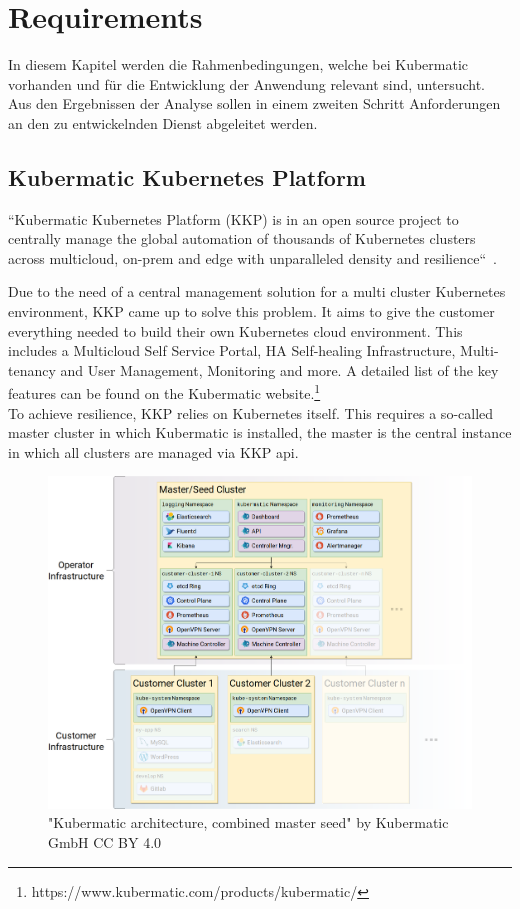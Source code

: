 \chapter{Requirements}

In diesem Kapitel werden die Rahmenbedingungen, welche bei Kubermatic vorhanden und für die Entwicklung der Anwendung relevant sind, untersucht.
Aus den Ergebnissen der Analyse sollen in einem zweiten Schritt Anforderungen an den zu entwickelnden Dienst abgeleitet werden.


\section{Kubermatic Kubernetes Platform}

``Kubermatic Kubernetes Platform (KKP) is in an open source project to centrally manage the global automation of thousands of Kubernetes clusters across multicloud, on-prem and edge with unparalleled density and resilience``~\cite{KKP-GITHUB}.

Due to the need of a central management solution for a multi cluster Kubernetes environment, KKP came up to solve this problem.
It aims to give the customer everything needed to build their own Kubernetes cloud environment. 
This includes a Multicloud Self Service Portal, HA Self-healing Infrastructure, Multi-tenancy and User Management, Monitoring and more.
A detailed list of the key features can be found on the Kubermatic website.\footnote{https://www.kubermatic.com/products/kubermatic/}
\\
To achieve resilience, KKP relies on Kubernetes itself.
This requires a so-called master cluster in which Kubermatic is installed, the master is the central instance in which all clusters are managed via KKP api.

\begin{figure}[H]
    \centering
    \includegraphics[width=1\textwidth, left]{media/05/kkp}
    \caption{"Kubermatic architecture, combined master seed" by Kubermatic GmbH CC BY 4.0}
    \label{fig:kubermatic}
\end{figure}

